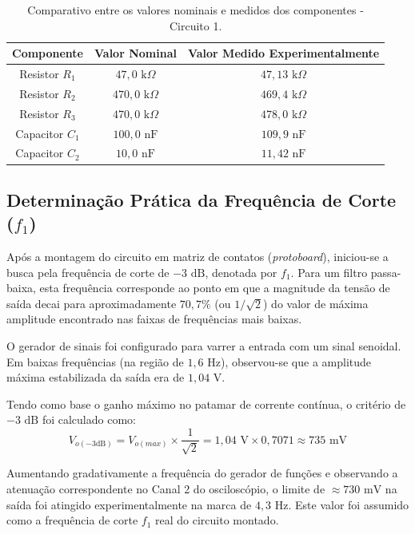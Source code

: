 \begin{table}[H]
	\centering
	\caption{Comparativo entre os valores nominais e medidos dos componentes - Circuito 1.}
	\label{tab:componentes_c1}
	\renewcommand{\arraystretch}{1.2}
	\begin{tabular}{ccc}
		\hline
		\textbf{Componente} & \textbf{Valor Nominal} & \textbf{Valor Medido Experimentalmente} \\ \hline
		Resistor $R_1$ & $47,0\text{ k}\Omega$ & $47,13\text{ k}\Omega$ \\
		Resistor $R_2$ & $470,0\text{ k}\Omega$ & $469,4\text{ k}\Omega$ \\
		Resistor $R_3$ & $470,0\text{ k}\Omega$ & $478,0\text{ k}\Omega$ \\
		Capacitor $C_1$ & $100,0\text{ nF}$ & $109,9\text{ nF}$ \\
		Capacitor $C_2$ & $10,0\text{ nF}$ & $11,42\text{ nF}$ \\ \hline
	\end{tabular}
\end{table}

\subsection{Determinação Prática da Frequência de Corte ($f_1$)}

Após a montagem do circuito em matriz de contatos (\textit{protoboard}), iniciou-se a busca pela frequência de corte de $-3\text{ dB}$, denotada por $f_1$. Para um filtro passa-baixa, esta frequência corresponde ao ponto em que a magnitude da tensão de saída decai para aproximadamente $70,7\%$ (ou $1/\sqrt{2}$) do valor de máxima amplitude encontrado nas faixas de frequências mais baixas.

O gerador de sinais foi configurado para varrer a entrada com um sinal senoidal. Em baixas frequências (na região de $1,6\text{ Hz}$), observou-se que a amplitude máxima estabilizada da saída era de $1,04\text{ V}$. 

Tendo como base o ganho máximo no patamar de corrente contínua, o critério de $-3\text{ dB}$ foi calculado como:
\begin{equation}
	V_{o(-3\text{dB})} = V_{o(max)} \times \frac{1}{\sqrt{2}} = 1,04\text{ V} \times 0,7071 \approx 735\text{ mV}
\end{equation}

Aumentando gradativamente a frequência do gerador de funções e observando a atenuação correspondente no Canal 2 do osciloscópio, o limite de $\approx 730\text{ mV}$ na saída foi atingido experimentalmente na marca de \textbf{$4,3\text{ Hz}$}. Este valor foi assumido como a frequência de corte $f_1$ real do circuito montado.


